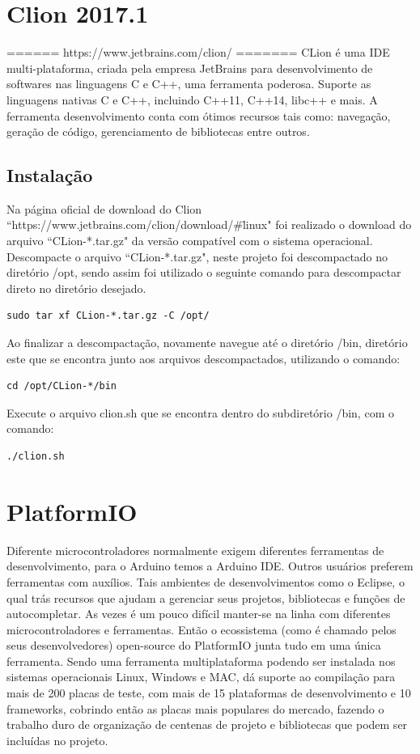 \documentclass[a4paper,12pt,portuguese]{ufms-cpcx}
\begin{document}
\section{Clion 2017.1}
====== https://www.jetbrains.com/clion/ =======
CLion é uma IDE multi-plataforma, criada pela empresa JetBrains para desenvolvimento de softwares nas linguagens C e C++, uma ferramenta poderosa. Suporte as linguagens nativas C e C++, incluindo C++11, C++14, libc++ e mais. A ferramenta desenvolvimento conta com ótimos recursos tais como: navegação, geração de código, gerenciamento de bibliotecas entre outros.

\subsection{Instalação}
Na página oficial de download do Clion ``https://www.jetbrains.com/clion/download/\#\=linux" foi realizado o download do arquivo ``CLion-*.tar.gz" da versão compatível com o sistema operacional. Descompacte o arquivo ``CLion-*.tar.gz", neste projeto foi descompactado no diretório /opt, sendo assim foi utilizado o seguinte comando para descompactar direto no diretório desejado.
\begin{lstlisting}
sudo tar xf CLion-*.tar.gz -C /opt/
\end{lstlisting}
Ao finalizar a descompactação, novamente navegue até o diretório /bin, diretório este que se encontra junto aos arquivos descompactados, utilizando o comando: 
\begin{lstlisting}
cd /opt/CLion-*/bin
\end{lstlisting}
Execute o arquivo clion.sh que se encontra dentro do subdiretório /bin, com o comando:
\begin{lstlisting}
./clion.sh
\end{lstlisting}

\section{PlatformIO}
Diferente microcontroladores normalmente exigem diferentes ferramentas de desenvolvimento, para o Arduino temos a Arduino IDE. Outros usuários preferem ferramentas com auxílios. Tais ambientes de desenvolvimentos como o Eclipse, o qual trás recursos que ajudam a gerenciar seus projetos, bibliotecas e funções de autocompletar. As vezes é um pouco difícil manter-se na linha com diferentes microcontroladores e ferramentas. Então o ecossistema (como é chamado pelos seus desenvolvedores) open-source do PlatformIO junta tudo em uma única ferramenta. Sendo uma ferramenta multiplataforma podendo ser instalada nos sistemas operacionais Linux, Windows e MAC, dá suporte ao compilação para mais de 200 placas de teste, com mais de 15 plataformas de desenvolvimento e 10 frameworks, cobrindo então as placas mais populares do mercado, fazendo o trabalho duro de organização de centenas de projeto e bibliotecas que podem ser incluídas no projeto.
\end{document}
